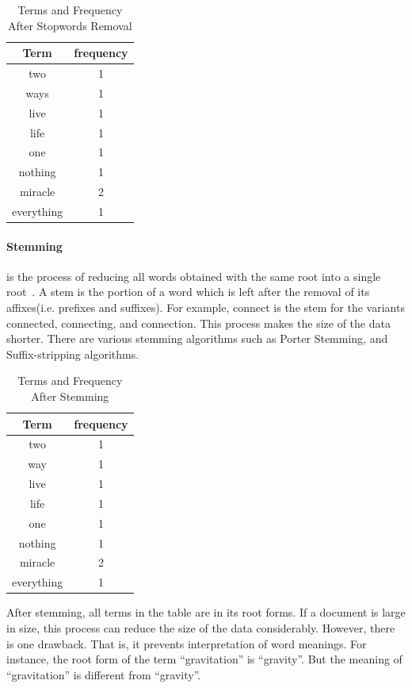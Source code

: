 \begin{table}
\centering
\begin{tabular}{|c|c|}
\hline \textbf{Term} & \textbf{frequency} \\
\hline two & 1 \\
\hline ways & 1 \\
\hline live & 1 \\
\hline life & 1 \\
\hline one & 1 \\
\hline nothing & 1 \\
\hline miracle & 2 \\
\hline everything & 1 \\  
\hline
\end{tabular}
\caption{Terms and Frequency After Stopwords Removal} \label{table:stopwordsremoval}
\end{table}

\paragraph{Stemming} is the process of reducing all words obtained with the same root into a single root~\cite[P. 20]{IRarchitecture}. 
A stem is the portion of a word which is left after
the removal of its affixes(i.e. prefixes and suffixes). For example, connect is the stem for the variants connected, connecting, and connection.
This process makes the size of the data shorter. There are various stemming algorithms such as Porter Stemming, and Suffix-stripping algorithms.

\begin{table}
\centering
\begin{tabular}{|c|c|}
\hline \textbf{Term} & \textbf{frequency} \\
\hline two & 1 \\
\hline way & 1 \\
\hline live & 1 \\
\hline life & 1 \\
\hline one & 1 \\
\hline nothing & 1 \\
\hline miracle & 2 \\
\hline everything & 1 \\  
\hline
\end{tabular}
\caption{Terms and Frequency After Stemming} \label{table:stemming}
\end{table}
After stemming, all terms in the table are in its root forms. If a document is large in size, this process can reduce the size of the data considerably. However, 
there is one drawback. That is, it prevents interpretation of word meanings. For instance, the root form of the term ``gravitation'' is ``gravity''. But
the meaning of ``gravitation'' is different from ``gravity''.

